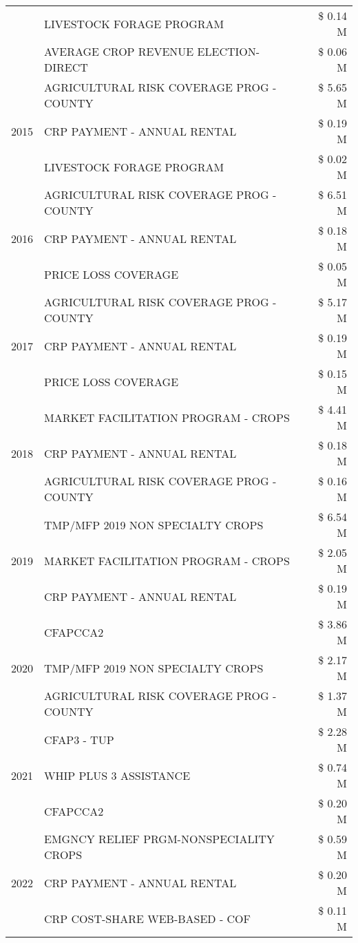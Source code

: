 \begin{tabular}{llr}
 & LIVESTOCK FORAGE PROGRAM & \$ 0.14 M \\
 & AVERAGE CROP REVENUE ELECTION-DIRECT & \$ 0.06 M \\
\cline{1-3}
\multirow[t]{3}{*}{2015} & AGRICULTURAL RISK COVERAGE PROG - COUNTY & \$ 5.65 M \\
 & CRP PAYMENT - ANNUAL RENTAL & \$ 0.19 M \\
 & LIVESTOCK FORAGE PROGRAM & \$ 0.02 M \\
\cline{1-3}
\multirow[t]{3}{*}{2016} & AGRICULTURAL RISK COVERAGE PROG - COUNTY & \$ 6.51 M \\
 & CRP PAYMENT - ANNUAL RENTAL & \$ 0.18 M \\
 & PRICE LOSS COVERAGE & \$ 0.05 M \\
\cline{1-3}
\multirow[t]{3}{*}{2017} & AGRICULTURAL RISK COVERAGE PROG - COUNTY & \$ 5.17 M \\
 & CRP PAYMENT - ANNUAL RENTAL & \$ 0.19 M \\
 & PRICE LOSS COVERAGE & \$ 0.15 M \\
\cline{1-3}
\multirow[t]{3}{*}{2018} & MARKET FACILITATION PROGRAM - CROPS & \$ 4.41 M \\
 & CRP PAYMENT - ANNUAL RENTAL & \$ 0.18 M \\
 & AGRICULTURAL RISK COVERAGE PROG - COUNTY & \$ 0.16 M \\
\cline{1-3}
\multirow[t]{3}{*}{2019} & TMP/MFP 2019 NON SPECIALTY CROPS & \$ 6.54 M \\
 & MARKET FACILITATION PROGRAM - CROPS & \$ 2.05 M \\
 & CRP PAYMENT - ANNUAL RENTAL & \$ 0.19 M \\
\cline{1-3}
\multirow[t]{3}{*}{2020} & CFAPCCA2 & \$ 3.86 M \\
 & TMP/MFP 2019 NON SPECIALTY CROPS & \$ 2.17 M \\
 & AGRICULTURAL RISK COVERAGE PROG - COUNTY & \$ 1.37 M \\
\cline{1-3}
\multirow[t]{3}{*}{2021} & CFAP3 - TUP & \$ 2.28 M \\
 & WHIP PLUS 3 ASSISTANCE & \$ 0.74 M \\
 & CFAPCCA2 & \$ 0.20 M \\
\cline{1-3}
\multirow[t]{3}{*}{2022} & EMGNCY RELIEF PRGM-NONSPECIALITY CROPS & \$ 0.59 M \\
 & CRP PAYMENT - ANNUAL RENTAL & \$ 0.20 M \\
 & CRP COST-SHARE WEB-BASED - COF & \$ 0.11 M \\
\cline{1-3}
\bottomrule
\end{tabular}

